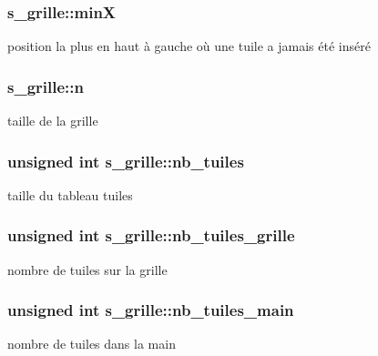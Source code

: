 \subsubsection[{\texorpdfstring{minX}{minX}}]{ s\+\_\+grille\+::minX}\hypertarget{structs__grille_adc46f40aa2b1eb2bf96885c55b497f4e}{}\label{structs__grille_adc46f40aa2b1eb2bf96885c55b497f4e}
position la plus en haut à gauche où une tuile a jamais été inséré 
\subsubsection[{\texorpdfstring{n}{n}}]{ s\+\_\+grille\+::n}\hypertarget{structs__grille_a09b07d21d4a001c90c4f4f8025ac3965}{}\label{structs__grille_a09b07d21d4a001c90c4f4f8025ac3965}
taille de la grille 
\subsubsection[{\texorpdfstring{nb\+\_\+tuiles}{nb_tuiles}}]{\setlength{\rightskip}{0pt plus 5cm}unsigned int s\+\_\+grille\+::nb\+\_\+tuiles}\hypertarget{structs__grille_a0f709b2f457ab146ea70a4a733d5a69d}{}\label{structs__grille_a0f709b2f457ab146ea70a4a733d5a69d}
taille du tableau \textquotesingle{}tuiles\textquotesingle{} 
\subsubsection[{\texorpdfstring{nb\+\_\+tuiles\+\_\+grille}{nb_tuiles_grille}}]{\setlength{\rightskip}{0pt plus 5cm}unsigned int s\+\_\+grille\+::nb\+\_\+tuiles\+\_\+grille}\hypertarget{structs__grille_a5d8aed076ffe76bf0d7086d229d4ab24}{}\label{structs__grille_a5d8aed076ffe76bf0d7086d229d4ab24}
nombre de tuiles sur la grille 
\subsubsection[{\texorpdfstring{nb\+\_\+tuiles\+\_\+main}{nb_tuiles_main}}]{\setlength{\rightskip}{0pt plus 5cm}unsigned int s\+\_\+grille\+::nb\+\_\+tuiles\+\_\+main}\hypertarget{structs__grille_ae2c7873819c9dc229c5528c208bd0d30}{}\label{structs__grille_ae2c7873819c9dc229c5528c208bd0d30}
nombre de tuiles dans la main 
